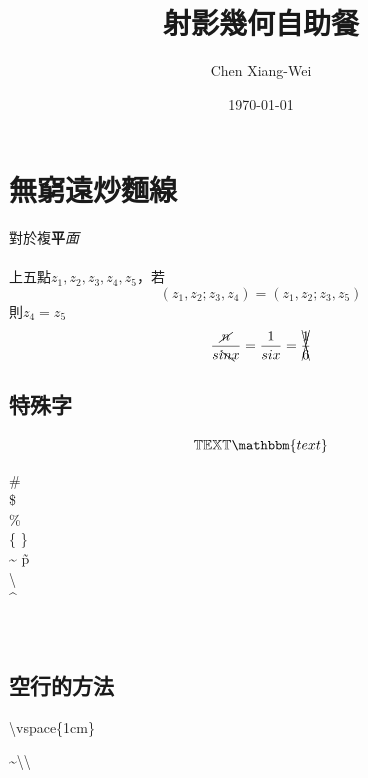 \RaggedRight
\setlength{\parindent}{2em} %
\newpage

\title{射影幾何自助餐} %
\author{Chen Xiang-Wei} %

\date{\today}%
\date{\ROCtoday}%
\maketitle
\thispagestyle{fancy}
\raggedright
{}
\tableofcontents  %

\setcounter{section}{-1}

\section{無窮遠炒麵線}
\pro
{\color[RGB]{0,255,200}對於}{\color{blue}複}\textbf{平}\textit{面}
~\\%
~\\%
上五點$z_{1}, z_{2}, z_{3},z_{4},z_{5}$，若\\
\[(z_{1},z_{2};z_{3},z_{4})=(z_{1},z_{2};z_{3},z_5)\]
則$z_{4}=z_{5}$\\


\pro 
$$
\frac{\cancel{n}}{si\bcancel{n} x}=\frac{1}{six}=\xcancel{\frac{1}{6}}
$$

\subsection[short]{特殊字}


$$
\mathbb{TEXT}
\mathbbm{text}
$$



\# \\
\$ \\
\% \\
\{ \} \\
\~{} \~p \\
\textbackslash \\
\^{}

\\

\subsection{空行的方法}

\textbackslash vspace\{1cm\}
\vspace{1cm}

\~{}\textbackslash\textbackslash
~\\%

